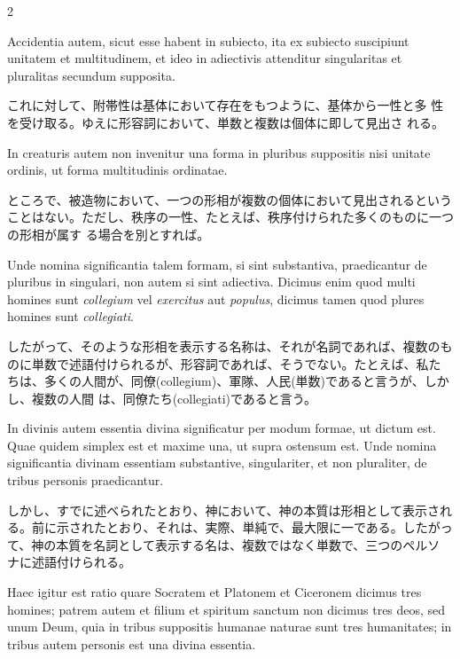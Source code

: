 \documentclass[paper=a4paper,fontsize=10pt,jafontsize=9pt,titlepage]{jlreq}
\begin{document}
\begin{paracol}{2}
\switchcolumn*

Accidentia autem, sicut esse habent in subiecto, ita ex subiecto
suscipiunt unitatem et multitudinem, et ideo in adiectivis attenditur
singularitas et pluralitas secundum supposita.

\switchcolumn

これに対して、附帯性は基体において存在をもつように、基体から一性と多
 性を受け取る。ゆえに形容詞において、単数と複数は個体に即して見出さ
 れる。

\switchcolumn*

In creaturis autem non
invenitur una forma in pluribus suppositis nisi unitate ordinis, ut
forma multitudinis ordinatae.

\switchcolumn

ところで、被造物において、一つの形相が複数の個体において見出されるという
 ことはない。ただし、秩序の一性、たとえば、秩序付けられた多くのものに一つの形相が属す
 る場合を別とすれば。

\switchcolumn*

Unde nomina significantia talem formam, si
sint substantiva, praedicantur de pluribus in singulari, non autem si
sint adiectiva. Dicimus enim quod multi homines sunt {\itshape collegium} vel
{\itshape exercitus} aut {\itshape populus}, dicimus tamen quod plures homines sunt
{\itshape collegiati}.

\switchcolumn

したがって、そのような形相を表示する名称は、それが名詞であれば、複数のも
 のに単数で述語付けられるが、形容詞であれば、そうでない。たとえば、私た
 ちは、多くの人間が、同僚(collegium)、軍隊、人民(単数)であると言うが、しかし、複数の人間
 は、同僚たち(collegiati)であると言う。

\switchcolumn*

In divinis autem essentia divina significatur per modum
formae, ut dictum est. Quae quidem simplex est et maxime una, ut supra
ostensum est. Unde nomina significantia divinam essentiam substantive,
singulariter, et non pluraliter, de tribus personis praedicantur.

\switchcolumn

しかし、すでに述べられたとおり、神において、神の本質は形相として表示され
 る。前に示されたとおり、それは、実際、単純で、最大限に一である。したがっ
 て、神の本質を名詞として表示する名は、複数ではなく単数で、三つのペルソ
 ナに述語付けられる。

\switchcolumn*

Haec
igitur est ratio quare Socratem et Platonem et Ciceronem dicimus tres
homines; patrem autem et filium et spiritum sanctum non dicimus tres
deos, sed unum Deum, quia in tribus suppositis humanae naturae sunt tres
humanitates; in tribus autem personis est una divina essentia.


\end{paracol}
\end{document}
